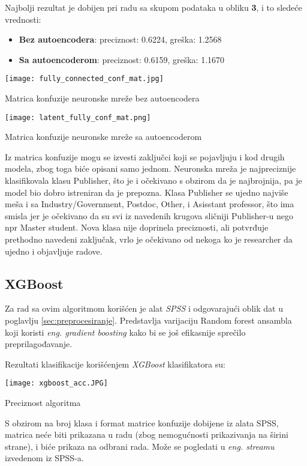 \documentclass[12pt]{article}
\begin{document}
Najbolji rezultat je dobijen pri radu sa skupom podataka u obliku \textbf{3}, i to sledeće vrednosti:
\begin{itemize}
  \item \textbf{Bez autoencodera}: preciznost: 0.6224, greška: 1.2568
  \item \textbf{Sa autoencoderom}: preciznost: 0.6159, greška: 1.1670
\end{itemize}
\begin{center}
\texttt{[image: fully\_connected\_conf\_mat.jpg]}
\caption{Matrica konfuzije neuronske mreže bez autoencodera}
\label{fig:figure1}
\end{center}
\begin{center}
\texttt{[image: latent\_fully\_conf\_mat.png]}
\caption{Matrica konfuzije neuronske mreže sa autoencoderom}
\label{fig:figure2}
\end{center}
Iz matrica konfuzije mogu se izvesti zaključci koji se pojavljuju i kod drugih modela, zbog toga biće opisani samo jednom. Neuronska mreža je najpreciznije klasifikovala klasu Publisher, što je i očekivano s obzirom da je najbrojnija, pa je model bio dobro istreniran da je prepozna. Klasa Publisher se ujedno najviše meša i sa Industry/Government, Postdoc, Other, i Asisstant professor, što ima smisla jer je očekivano da su svi iz navedenih krugova sličniji Publisher-u nego npr Master student. Nova klasa nije doprinela preciznosti, ali potvrđuje prethodno navedeni zaključak, vrlo je očekivano od nekoga ko je researcher da ujedno i objavljuje radove.

\newpage

\subsection{XGBoost}

Za rad sa ovim algoritmom korišćen je alat \textit{SPSS} i odgovarajući oblik dat u poglavlju \ref{sec:preprocesiranje}. Predstavlja varijaciju Random forest ansambla koji koristi \textit{eng. gradient boosting} kako bi se još efikasnije sprečilo preprilagođavanje.

Rezultati klasifikacije korišćenjem \textit{XGBoost} klasifikatora su:

\begin{center}
\texttt{[image: xgboost\_acc.JPG]}
\caption{Preciznost algoritma}
\label{fig:figure4}
\end{center}
S obzirom na broj klasa i format matrice konfuzije dobijene iz alata SPSS, matrica neće biti prikazana u radu (zbog nemogućnosti prikazivanja na širini strane), i biće prikaza na odbrani rada.
Može se pogledati u \textit{eng. streamu} izvedenom iz SPSS-a.
\end{document}
